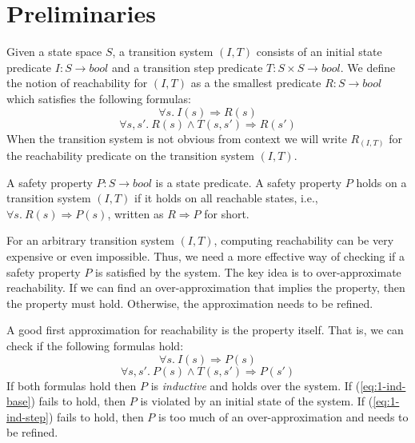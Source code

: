 \section{Preliminaries}
\label{sec:background}

\newcommand{\bool}[0]{\mathit{bool}}
\newcommand{\reach}[0]{\mathit{R}}
\newcommand{\ite}[3]{\mathit{if}\ #1\ \mathit{then}\ #2\ \mathit{else}\ #3}


Given a state space $S$, a transition system $(I,T)$ consists of an
initial state predicate $I : S \to \bool$ and a transition step
predicate $T : S \times S \to \bool$. We define the notion of
reachability for $(I, T)$ as a the smallest predicate $\reach : S \to
\bool$ which satisfies the following formulas:
\begin{equation*}
  \forall s.~ I(s) \Rightarrow \reach(s)
\end{equation*}
\begin{equation*}
  \forall s, s'.~ \reach(s) \land T(s, s') \Rightarrow \reach(s')
\end{equation*}
When the transition system is not obvious from context we will write
$\reach_{(I,T)}$ for the reachability predicate on the transition
system $(I,T)$. 

A safety property $P : S \to \bool$ is a state predicate. A safety
property $P$ holds on a transition system $(I, T)$ if it holds on all
reachable states, i.e., $\forall s.~ \reach(s) \Rightarrow P(s)$,
written as $\reach \Rightarrow P$ for short.

For an arbitrary transition system $(I, T)$, computing reachability
can be very expensive or even impossible. Thus, we need a more
effective way of checking if a safety property $P$ is satisfied by the
system. The key idea is to over-approximate reachability. If we can
find an over-approximation that implies the property, then the
property must hold. Otherwise, the approximation needs to be refined.

A good first approximation for reachability is the property itself.
That is, we can check if the following formulas hold:
\begin{equation}
  \forall s.~ I(s) \Rightarrow P(s)
  \label{eq:1-ind-base}
\end{equation}
\begin{equation}
  \forall s, s'.~ P(s) \land T(s, s') \Rightarrow P(s')
  \label{eq:1-ind-step}
\end{equation}
If both formulas hold then $P$ is {\em inductive} and holds over the
system. If (\ref{eq:1-ind-base}) fails to hold, then $P$ is violated
by an initial state of the system. If (\ref{eq:1-ind-step}) fails to
hold, then $P$ is too much of an over-approximation and needs to be
refined.

